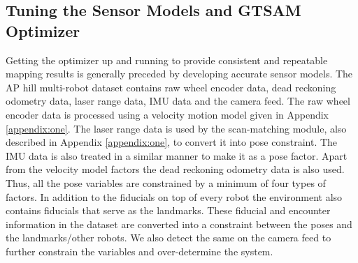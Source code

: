 \subsection{Tuning the Sensor Models and GTSAM Optimizer}
Getting the optimizer up and running to provide consistent and repeatable mapping results is generally preceded by developing accurate sensor models. The AP hill multi-robot dataset contains raw wheel encoder data, dead reckoning odometry data, laser range data, IMU data and the camera feed. The raw wheel encoder data is processed using a velocity motion model given in Appendix \ref{appendix:one}. The laser range data is used by the scan-matching module, also described in Appendix \ref{appendix:one}, to convert it into pose constraint. The IMU data is also treated in a similar manner to make it as a pose factor. Apart from the velocity model factors the dead reckoning odometry data is also used. Thus, all the pose variables are constrained by a minimum of four types of factors. In addition to the fiducials on top of every robot the environment also contains fiducials that serve as the landmarks. These fiducial and encounter information in the dataset are converted into a constraint between the poses and the landmarks/other robots. We also detect the same on the camera feed to further constrain the variables and over-determine the system. 
